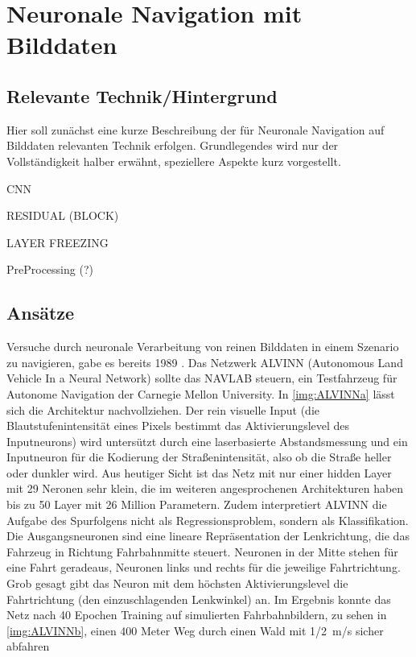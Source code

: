 %
\chapter{Neuronale Navigation mit Bilddaten}

\section{Relevante Technik/Hintergrund}
Hier soll zunächst eine kurze Beschreibung der für Neuronale Navigation auf Bilddaten relevanten Technik erfolgen. Grundlegendes wird nur der Vollständigkeit halber erwähnt, speziellere Aspekte kurz vorgestellt. 

CNN 

RESIDUAL (BLOCK)

LAYER FREEZING 

PreProcessing (?)



\section{Ansätze}

Versuche durch neuronale Verarbeitung von reinen Bilddaten in einem Szenario zu navigieren, gabe es bereits 1989 \cite{pomerleau1989alvinn}.
Das Netzwerk ALVINN (Autonomous Land Vehicle In a Neural Network) sollte das NAVLAB steuern, ein Testfahrzeug für Autonome Navigation der Carnegie Mellon University.
In \ref{img:ALVINNa} lässt sich die Architektur nachvollziehen. 
Der rein visuelle Input (die Blautstufenintensität eines Pixels bestimmt das Aktivierungslevel des Inputneurons) wird untersützt durch eine laserbasierte Abstandsmessung und ein Inputneuron für die Kodierung der \glqq Straßenintensität\grqq{}, also ob die Straße heller oder dunkler wird.
Aus heutiger Sicht ist das Netz mit nur einer hidden Layer mit 29 Neronen sehr klein, die im weiteren angesprochenen Architekturen haben bis zu 50 Layer mit 26 Million Parametern. 
Zudem interpretiert ALVINN die Aufgabe des Spurfolgens nicht als Regressionsproblem, sondern als Klassifikation. Die Ausgangsneuronen sind eine lineare Repräsentation der Lenkrichtung, die das Fahrzeug in Richtung Fahrbahnmitte steuert. Neuronen in der Mitte stehen für eine Fahrt geradeaus, Neuronen links und rechts für die jeweilige Fahrtrichtung.
Grob gesagt gibt das Neuron mit dem höchsten Aktivierungslevel die Fahrtrichtung (den einzuschlagenden Lenkwinkel) an.
Im Ergebnis konnte das Netz nach 40 Epochen Training auf simulierten Fahrbahnbildern, zu sehen in \ref{img:ALVINNb}, einen 400 Meter Weg durch einen Wald mit \SI{1/2}{\meter/\second} sicher abfahren



